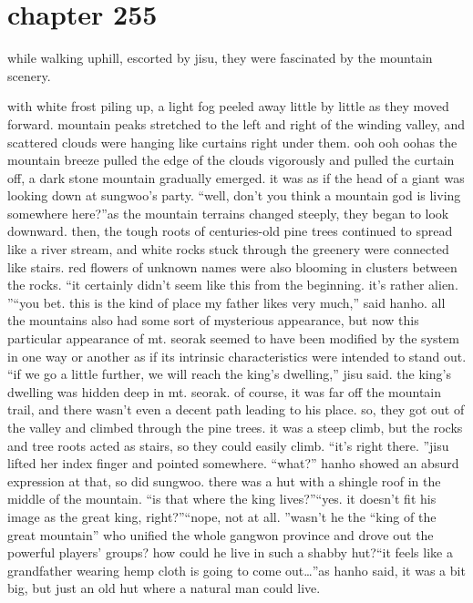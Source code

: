\section{chapter 255}

                            while walking uphill, escorted by jisu, they were fascinated by the mountain scenery.





with white frost piling up, a light fog peeled away little by little as they moved forward.
mountain peaks stretched to the left and right of the winding valley, and scattered clouds were hanging like curtains right under them.
ooh ooh oohas the mountain breeze pulled the edge of the clouds vigorously and pulled the curtain off, a dark stone mountain gradually emerged.
 it was as if the head of a giant was looking down at sungwoo’s party.
“well, don’t you think a mountain god is living somewhere here?”as the mountain terrains changed steeply, they began to look downward.
then, the tough roots of centuries-old pine trees continued to spread like a river stream, and white rocks stuck through the greenery were connected like stairs.
red flowers of unknown names were also blooming in clusters between the rocks.
“it certainly didn’t seem like this from the beginning.
 it’s rather alien.
”“you bet.
 this is the kind of place my father likes very much,” said hanho.
all the mountains also had some sort of mysterious appearance, but now this particular appearance of mt.
 seorak seemed to have been modified by the system in one way or another as if its intrinsic characteristics were intended to stand out.
“if we go a little further, we will reach the king’s dwelling,” jisu said.
the king’s dwelling was hidden deep in mt.
 seorak.
 of course, it was far off the mountain trail, and there wasn’t even a decent path leading to his place.
so, they got out of the valley and climbed through the pine trees.
 it was a steep climb, but the rocks and tree roots acted as stairs, so they could easily climb.
“it’s right there.
”jisu lifted her index finger and pointed somewhere.
“what?”
hanho showed an absurd expression at that, so did sungwoo.
there was a hut with a shingle roof in the middle of the mountain.
“is that where the king lives?”“yes.
 it doesn’t fit his image as the great king, right?”“nope, not at all.
”wasn’t he the “king of the great mountain” who unified the whole gangwon province and drove out the powerful players’ groups? how could he live in such a shabby hut?“it feels like a grandfather wearing hemp cloth is going to come out…”as hanho said, it was a bit big, but just an old hut where a natural man could live.
